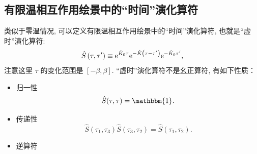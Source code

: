 \subsection{有限温相互作用绘景中的“时间”演化算符}
类似于零温情况, 可以定义有限温相互作用绘景中的“时间”演化算符, 也就是“虚时”演化算符:
\begin{equation}
\hat{S}\left(\tau, \tau^{\prime}\right) \equiv \mathrm{e}^{\hat{K}_0 \tau} \mathrm{e}^{-\hat{K}\left(\tau-\tau^{\prime}\right)} \mathrm{e}^{-\hat{K}_0 \tau^{\prime}},
\end{equation}
注意这里 $\tau$ 的变化范围是 $[-\beta, \beta]$. “虚时”演化算符不是幺正算符, 有如下性质：
\begin{itemize}
\item 归一性
\begin{equation}
\hat{S}(\tau, \tau)=\mathbbm{1}.
\end{equation}
\item 传递性
\begin{equation}
\hat{S}\left(\tau_1, \tau_3\right) \hat{S}\left(\tau_3, \tau_2\right)=\hat{S}\left(\tau_1, \tau_2\right).
\end{equation}
\item 逆算符


\end{itemize}
